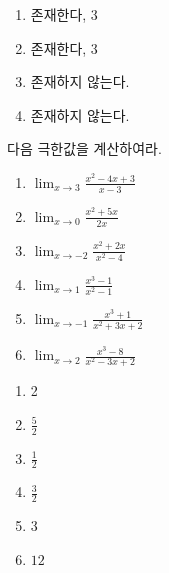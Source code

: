 \documentclass[a4paper]{oblivoir}
\begin{document}
\begin{Answer}
\begin{enumerate}[(1)]
\item
존재한다, 3
\item
존재한다, 3
\item
존재하지 않는다.
\item
존재하지 않는다.
\end{enumerate}
\end{Answer}

%
\begin{Exercise}
다음 극한값을 계산하여라.
\begin{enumerate}[(1)]
\item
\(\displaystyle\lim_{x\to3}\frac{x^2-4x+3}{x-3}\)
\item
\(\displaystyle\lim_{x\to0}\frac{x^2+5x}{2x}\)
\item
\(\displaystyle\lim_{x\to-2}\frac{x^2+2x}{x^2-4}\)
\item
\(\displaystyle\lim_{x\to1}\frac{x^3-1}{x^2-1}\)
\item
\(\displaystyle\lim_{x\to-1}\frac{x^3+1}{x^2+3x+2}\)
\item
\(\displaystyle\lim_{x\to2}\frac{x^3-8}{x^2-3x+2}\)
\end{enumerate}
\end{Exercise}

\begin{Answer}
\begin{enumerate}[(1)]
\item
2
\item
\(\frac52\)
\item
\(\frac12\)
\item
\(\frac32\)
\item
3
\item
\(12\)
\end{enumerate}
\end{Answer}

\newpage
\shipoutAnswer
\end{document}
